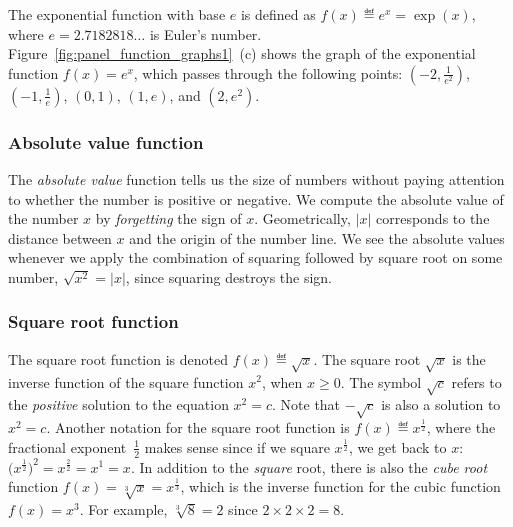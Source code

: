 			The exponential function with base $e$
			is defined as $f(x) \eqdef e^{x} = \exp(x)$,
			where $e=2.7182818\ldots$ is Euler's number.
			Figure~\ref{fig:panel_function_graphs1}~(c)
			shows the graph of the exponential function $f(x)=e^x$,
			which passes through the following points:
			$(-2,\frac{1}{e^2})$, 
			$(-1,\frac{1}{e})$, 
			$(0,1)$, 
			$(1,e)$, 
			and $(2,e^2)$.









		\subsubsection{Absolute value function}

			The \emph{absolute value} function tells us the size of numbers
			without paying attention to whether the number is positive or negative.
			We compute the absolute value of the number $x$ by \emph{forgetting} the sign of $x$.
			Geometrically,
			$|x|$ corresponds to the distance between $x$ and the origin of the number line.
			We see the absolute values whenever we apply
			the combination of squaring followed by square root on some number,
			$\sqrt{ x^2 }  = |x|$,
			since squaring destroys the sign.




		\subsubsection{Square root function}

			The square root function is denoted $f(x) \eqdef \sqrt{x}$.
			The square root $\sqrt{x}$ is the inverse function of the square function $x^2$,
			when $x \geq 0$.
			The symbol $\sqrt{c}$ refers to the \emph{positive} solution to the equation $x^2=c$.
			Note that $-\sqrt{c}$ is also a solution to $x^2=c$.
			Another notation for the square root function is $f(x) \eqdef x^{\frac{1}{2}}$,
			where the fractional exponent~$\frac{1}{2}$ makes sense
			since if we square $x^{\frac{1}{2}}$,
			we get back to $x$:
			$\big(x^{\frac{1}{2}}\big)^2 = x^{\frac{2}{2}} = x^{1} = x$.
			In addition to the \emph{square} root,
			there is also the \emph{cube root} function $f(x) = \sqrt[3]{x}  = x^{\frac{1}{3}}$,
			which is the inverse function for the cubic function $f(x)=x^3$.
			For example,
			$\sqrt[3]{8}=2$ since $2\times2\times2=8$.



